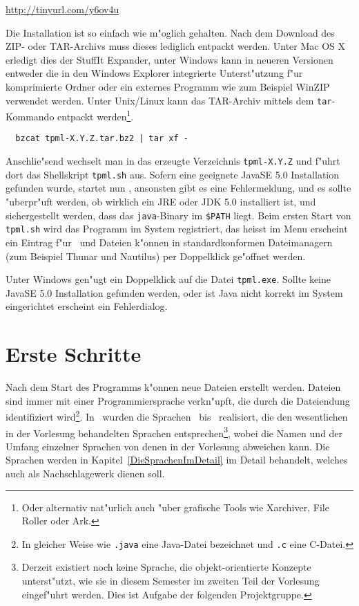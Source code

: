 \url{http://tinyurl.com/y6ov4u}

Die Installation ist so einfach wie m"oglich gehalten. Nach dem Download des ZIP- oder TAR-Archivs muss dieses
lediglich entpackt werden. Unter Mac OS X erledigt dies der StuffIt Expander, unter Windows kann in
neueren Versionen entweder die in den Windows Explorer integrierte Unterst"utzung f"ur komprimierte
Ordner oder ein externes Programm wie zum Beispiel WinZIP verwendet werden. Unter Unix/Linux kann
das TAR-Archiv mittels dem {\tt tar}-Kommando entpackt werden\footnote{Oder alternativ nat"urlich
auch "uber grafische Tools wie Xarchiver, File Roller oder Ark.}.
\begin{verbatim}
  bzcat tpml-X.Y.Z.tar.bz2 | tar xf -
\end{verbatim}
Anschlie"send wechselt man in das erzeugte Verzeichnis {\tt tpml-X.Y.Z} und f"uhrt dort das Shellskript
{\tt tpml.sh} aus. Sofern eine geeignete JavaSE 5.0 Installation gefunden wurde, startet nun \TPML,
ansonsten gibt es eine Fehlermeldung, und es sollte "uberpr"uft werden, ob wirklich ein JRE oder JDK
5.0 installiert ist, und sichergestellt werden, dass das {\tt java}-Binary im {\tt \$PATH} liegt. Beim
ersten Start von {\tt tpml.sh} wird das Programm im System registriert, das heisst im Menu erscheint
ein Eintrag f"ur \TPML\ und Dateien k"onnen in standardkonformen Dateimanagern (zum Beispiel Thunar
und Nautilus) per Doppelklick ge"offnet werden.

Unter Windows gen"ugt ein Doppelklick auf die Datei {\tt tpml.exe}. Sollte keine JavaSE 5.0
Installation gefunden werden, oder ist Java nicht korrekt im System eingerichtet erscheint
ein Fehlerdialog.



\section{Erste Schritte}

Nach dem Start des Programms k"onnen neue Dateien erstellt werden. Dateien sind immer mit einer
Programmiersprache verkn"upft, die durch die Dateiendung identifiziert wird\footnote{In gleicher
Weise wie {\tt .java} eine Java-Datei bezeichnet und {\tt .c} eine C-Datei.}. In \TPML\ wurden
die Sprachen \LZERO\ bis \LFOUR\ realisiert, die den wesentlichen in der Vorlesung behandelten
Sprachen entsprechen\footnote{Derzeit existiert noch keine Sprache, die objekt-orientierte
Konzepte unterst"utzt, wie sie in diesem Semester im zweiten Teil der Vorlesung eingef"uhrt
werden. Dies ist Aufgabe der folgenden Projektgruppe.}, wobei die Namen und der Umfang
einzelner Sprachen von denen in der Vorlesung abweichen kann. Die Sprachen werden in
Kapitel~\ref{DieSprachenImDetail} im Detail behandelt, welches auch als Nachschlagewerk
dienen soll.

